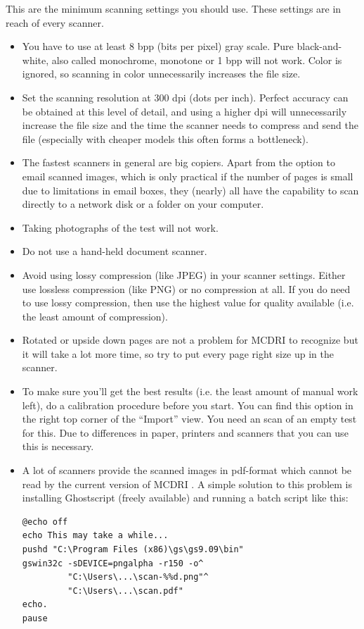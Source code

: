 \documentclass[10pt,a4paper]{article}
\newcommand{\name}{MCDRI }
\begin{document}
This are the minimum scanning settings you should use. These settings are in reach of every scanner.
\begin{itemize}
\item You have to use at least 8 bpp (bits per pixel) gray scale. Pure black-and-white, also called monochrome, monotone or 1 bpp will not work. Color is ignored, so scanning in color unnecessarily increases the file size.
\item Set the scanning resolution at 300 dpi (dots per inch). Perfect accuracy can be obtained at this level of detail, and using a higher dpi will unnecessarily increase the file size and the time the scanner needs to compress and send the file (especially with cheaper models this often forms a bottleneck).
\item The fastest scanners in general are big copiers. Apart from the option to email scanned images, which is only practical if the number of pages is small due to limitations in email boxes, they (nearly) all have the capability to scan directly to a network disk or a folder on your computer.
\item Taking photographs of the test will not work.
\item Do not use a hand-held document scanner.
\item Avoid using lossy compression (like JPEG) in your scanner settings. Either use lossless compression (like PNG) or no compression at all. If you do need to use lossy compression, then use the highest value for quality available (i.e. the least amount of compression).
\item Rotated or upside down pages are not a problem for \name to recognize but it will take a lot more time, so try to put every page right size up in the scanner.
\item To make sure you'll get the best results (i.e. the least amount of manual work left), do a calibration procedure before you start. You can find this option in the right top corner of the ``Import'' view. You need an scan of an empty test for this. Due to differences in paper, printers and scanners that you can use this is necessary.
\item A lot of scanners provide the scanned images in pdf-format which cannot be read by the current version of \name. A simple solution to this problem is installing Ghostscript (freely available) and running a batch script like this:
\begin{verbatim}
@echo off
echo This may take a while...
pushd "C:\Program Files (x86)\gs\gs9.09\bin"
gswin32c -sDEVICE=pngalpha -r150 -o^
         "C:\Users\...\scan-%%d.png"^
         "C:\Users\...\scan.pdf"
echo.
pause
\end{verbatim}
\end{itemize}
\end{document}
